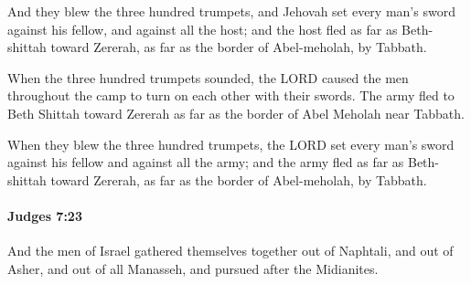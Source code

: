 			\begin{versebox}
					\item[BHS] 
					\item[ASV] And they blew the three hundred trumpets, and Jehovah set every man's sword against his fellow, and against all the host; and the host fled as far as Beth-shittah toward Zererah, as far as the border of Abel-meholah, by Tabbath.
					\item[NIV] When the three hundred trumpets sounded, the LORD caused the men throughout the camp to turn on each other with their swords. The army fled to Beth Shittah toward Zererah as far as the border of Abel Meholah near Tabbath.
					\item[NRSV] When they blew the three hundred trumpets, the LORD set every man’s sword against his fellow and against all the army; and the army fled as far as Beth-shittah toward Zererah, as far as the border of Abel-meholah, by Tabbath.
			\end{versebox}

		\paragraph{Judges 7:23} %
			\label{JUDGES-7-23}

			And the men of Israel gathered themselves together out of Naphtali, and out of Asher, and out of all Manasseh, and pursued after the Midianites.

